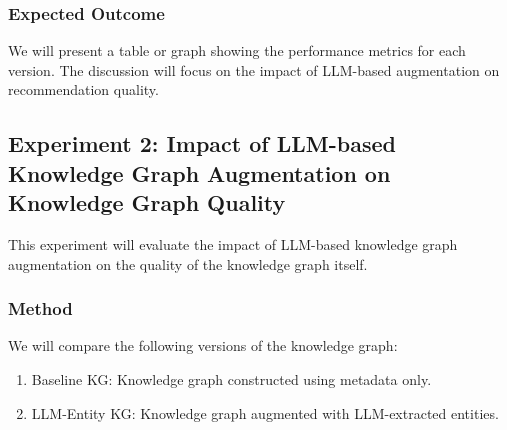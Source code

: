\documentclass{article}
\begin{document}
\subsubsection{Expected Outcome}
We will present a table or graph showing the performance metrics for each
version. The discussion will focus on the impact of LLM-based augmentation on
recommendation quality.


\subsection{Experiment 2:  Impact of LLM-based Knowledge Graph Augmentation on
    Knowledge Graph Quality}

This experiment will evaluate the impact of LLM-based knowledge graph
augmentation on the quality of the knowledge graph itself.

\subsubsection{Method}
We will compare the following versions of the knowledge graph:
\begin{enumerate}
      \item Baseline KG: Knowledge graph constructed using metadata only.
      \item LLM-Entity KG: Knowledge graph augmented with LLM-extracted entities.
\end{enumerate}
\end{document}
